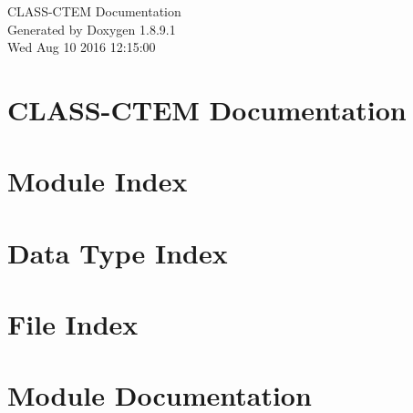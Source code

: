 \documentclass[twoside]{book}
\newcommand{\+}{\discretionary{\mbox{\scriptsize$\hookleftarrow$}}{}{}}
\newcommand{\clearemptydoublepage}{%
  \newpage{\pagestyle{empty}\cleardoublepage}%
}
\begin{document}
\hypersetup{pageanchor=false,
             bookmarks=true,
             bookmarksnumbered=true,
             pdfencoding=unicode
            }
\begin{titlepage}
\vspace*{7cm}
\begin{center}%
{\Large C\+L\+A\+S\+S-\/\+C\+T\+E\+M Documentation }\\
\vspace*{1cm}
{\large Generated by Doxygen 1.8.9.1}\\
\vspace*{0.5cm}
{\small Wed Aug 10 2016 12:15:00}\\
\end{center}
\end{titlepage}
\clearemptydoublepage
\tableofcontents
\clearemptydoublepage
{}
\hypersetup{pageanchor=true}

\chapter{C\+L\+A\+S\+S-\/\+C\+T\+E\+M Documentation}
\label{index}\hypertarget{index}{}
\chapter{Module Index}

\chapter{Data Type Index}

\chapter{File Index}

\chapter{Module Documentation}




















\end{document}
